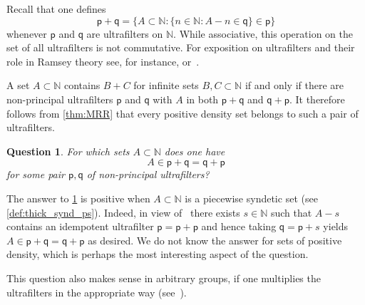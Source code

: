\documentclass[10pt,dvipsnames]{article}
\newtheorem{question}[theorem]{Question}
\theoremstyle{definition}
\theoremstyle{plain}
\newcommand{\N}{\mathbb{N}}
\newcommand{\ultra}[1]{\mathsf{#1}}
\begin{document}
Recall that one defines
\[
\ultra{p} + \ultra{q} = \{ A \subset \N : \{ n \in \N : A - n \in \ultra{q} \} \in \ultra{p} \}
\]
whenever $\ultra{p}$ and $\ultra{q}$ are ultrafilters on $\N$. 
While associative, this operation on the set of all ultrafilters is not commutative.
For exposition on ultrafilters and their role in Ramsey theory see, for instance, \cite[Section 3]{Bergelson96} or~\cite{Hindman-Strauss12}.

A set $A\subset \N$ contains $B+C$ for infinite sets $B,C \subset \N$ if and only if there are non-principal ultrafilters $\ultra{p}$ and $\ultra{q}$ with $A$ in both $\ultra{p} + \ultra{q}$ and $\ultra{q} + \ultra{p}$. 
It therefore follows from \cref{thm:MRR} that every positive density set belongs to such a pair of ultrafilters.

\begin{question}
\label{q_ultra}
For which sets $A \subset \N$ does one have
\[
A \in \ultra{p} + \ultra{q} = \ultra{q} + \ultra{p}
\]
for some pair $\ultra{p},\ultra{q}$ of non-principal ultrafilters?
\end{question}

The answer to \cref{q_ultra} is positive when $A\subset\N$ is a piecewise syndetic set (see  \cref{def:thick_synd_ps}). Indeed, in view of~\cite[Theorem 4.43]{Hindman-Strauss12} there exists $s\in\N$ such that $A-s$ contains an idempotent ultrafilter $\ultra{p}=\ultra{p}+\ultra{p}$ and hence taking $\ultra{q}=\ultra{p}+s$ yields $A \in \ultra{p} + \ultra{q} = \ultra{q} + \ultra{p}$ as desired. We do not know the answer for sets of positive density, which is perhaps the most interesting aspect of the question.

This question also makes sense in arbitrary groups, if one multiplies the ultrafilters in the appropriate way (see~\cite[Page~642]{MRR}). 
\end{document}
